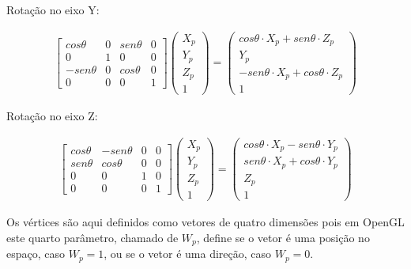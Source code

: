 {Rotação no eixo Y:

\begin{align}
\left[\begin{array}{cccc}
cos\theta & 0 & sen\theta & 0\\
0 & 1 & 0 & 0\\
-sen\theta & 0 & cos\theta & 0\\
0 & 0 & 0 & 1
\end{array}\right]
\left(\begin{array}{c}
X_p\\
Y_p\\
Z_p\\
1
\end{array}\right) =
\left(\begin{array}{c}
cos\theta \cdot X_p + sen\theta \cdot Z_p\\
Y_p\\
-sen\theta \cdot X_p + cos\theta \cdot Z_p\\
1
\end{array}\right)
\label{eq:rend_rotationMatY}
\end{align}

Rotação no eixo Z:

\begin{align}
\left[\begin{array}{cccc}
cos\theta & -sen\theta & 0 & 0\\
sen\theta & cos\theta & 0 & 0\\
0 & 0 & 1 & 0\\
0 & 0 & 0 & 1
\end{array}\right]
\left(\begin{array}{c}
X_p\\
Y_p\\
Z_p\\
1
\end{array}\right) =
\left(\begin{array}{c}
cos\theta \cdot X_p - sen\theta \cdot Y_p\\
sen\theta \cdot X_p + cos\theta \cdot Y_p\\
Z_p\\
1
\end{array}\right)
\label{eq:rend_rotationMatZ}
\end{align}


Os vértices são aqui definidos como vetores de quatro dimensões pois em OpenGL
este quarto parâmetro, chamado de $W_p$, define se o vetor é uma posição no
espaço, caso $W_p = 1$, ou se o vetor é uma direção, caso $W_p = 0$.

}
